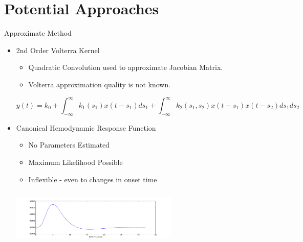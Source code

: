 \documentclass{beamer}
\begin{document}
\section{Potential Approaches}
\begin{frame}{Approximate Method}
  \begin{itemize}
    \item 2nd Order Volterra Kernel \cite{Friston2000}
    \begin{itemize}
        \item Quadratic Convolution used to approximate Jacobian Matrix.
        \item Volterra approximation quality is not known.
    \end{itemize}
    {\footnotesize
    $$y(t) = k_0 + \int_{-\infty}^{\infty} k_1(s_1) x(t-s_1) ds_1
        + \int_{-\infty}^{\infty} k_2(s_1,s_2) x(t-s_1)x(t-s_2) ds_1 ds_2$$
    }
    \item Canonical Hemodynamic Response Function
    \begin{itemize}
        \item No Parameters Estimated
        \item Maximum Likelihood Possible
        \item Inflexible - even to changes in onset time
    \end{itemize}
    \begin{center}
    \includegraphics[clip=true,trim=4.88cm 0cm 5cm 1.5cm,height=2.7cm,width=8cm]{HRF}
    \end{center}
    
  \end{itemize}
\end{frame}
\end{document}
